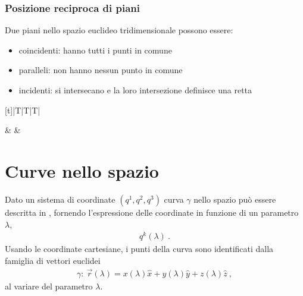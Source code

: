 \documentclass[letterpaper,10pt,italian]{jupyterBook}
\begin{document}
\subsubsection{Posizione reciproca di piani}
\label{\detokenize{ch/analytic_geometry/analytic_geometry_3d/planes:posizione-reciproca-di-piani}}
\sphinxAtStartPar
Due piani nello spazio euclideo tridimensionale possono essere:
\begin{itemize}
\item {} 
\sphinxAtStartPar
coincidenti: hanno tutti i punti in comune

\item {} 
\sphinxAtStartPar
paralleli: non hanno nessun punto in comune

\item {} 
\sphinxAtStartPar
incidenti: si intersecano e la loro intersezione definisce una retta

\end{itemize}


\begin{savenotes}\sphinxattablestart
\centering
\begin{tabulary}{\linewidth}[t]{|T|T|T|}
\hline

\sphinxAtStartPar
{}
&
\sphinxAtStartPar
{}
&
\sphinxAtStartPar
{}
\\
\hline
\end{tabulary}
\par
\sphinxattableend\end{savenotes}



\sphinxstepscope


\section{Curve nello spazio}
\label{\detokenize{ch/analytic_geometry/analytic_geometry_3d/curves:curve-nello-spazio}}\label{\detokenize{ch/analytic_geometry/analytic_geometry_3d/curves:geometry-analytic-3d-curves}}\label{\detokenize{ch/analytic_geometry/analytic_geometry_3d/curves::doc}}
\sphinxAtStartPar
Dato un sistema di coordinate \((q^1, q^2, q^3)\) curva \(\gamma\) nello spazio può essere descritta in , fornendo l’espressione delle coordinate in funzione di un parametro \(\lambda\),
\begin{equation*}
\begin{split}q^k(\lambda) \ .\end{split}
\end{equation*}
\sphinxAtStartPar
Usando le coordinate cartesiane, i punti della curva sono identificati dalla famiglia di vettori euclidei
\begin{equation*}
\begin{split}\gamma: \ \vec{r}(\lambda) = x(\lambda) \hat{x} + y(\lambda) \hat{y} + z(\lambda) \hat{z} \ ,\end{split}
\end{equation*}
\sphinxAtStartPar
al variare del parametro \(\lambda\).
\end{document}
